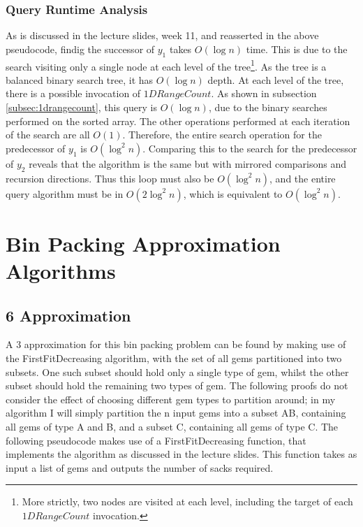 \documentclass[paper=a4, fontsize=12pt]{article}
\begin{document}
\subsubsection{Query Runtime Analysis}

As is discussed in the lecture slides, week 11, and reasserted in the above
pseudocode, findig the successor of \(y_1\) takes \(O(\log n)\) time. This is
due to the search visiting only a single node at each level of the
tree\footnote{More strictly, two nodes are visited at each level, including the
  target of each \(1DRangeCount\) invocation.}. As the tree is a balanced
binary search tree, it has \(O(\log n)\) depth. At each level of the tree,
there is a possible invocation of \(1DRangeCount\). As shown in subsection
\ref{subsec:1drangecount}, this query is \(O(\log n)\), due to the binary
searches performed on the sorted array. The other operations performed at each
iteration of the search are all \(O(1)\). Therefore, the entire search
operation for the predecessor of \(y_1\) is \(O(\log^2 n)\). Comparing this to
the search for the predecessor of \(y_2\) reveals that the algorithm is the
same but with mirrored comparisons and recursion directions. Thus this loop
must also be \(O(\log^2 n)\), and the entire query algorithm must be in
\(O(2\log^2 n)\), which is equivalent to \(O(\log^2 n)\).

\section{Bin Packing Approximation Algorithms}

\subsection{6 Approximation}

A 3 approximation for this bin packing problem can be found by making use of
the FirstFitDecreasing algorithm, with the set of all gems partitioned into two
subsets. One such subset should hold only a single type of gem, whilst the
other subset should hold the remaining two types of gem. The following proofs
do not consider the effect of choosing different gem types to partition around;
in my algorithm I will simply partition the n input gems into a subset AB,
containing all gems of type A and B, and a subset C, containing all gems of
type C. The following pseudocode makes use of a FirstFitDecreasing function,
that implements the algorithm as discussed in the lecture slides. This function
takes as input a list of gems and outputs the number of sacks required.
\end{document}
